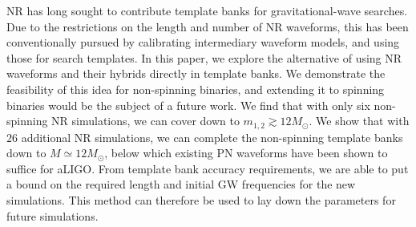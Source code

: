 \documentclass[aps,
prd,
twocolumn,
superscriptaddress,
lengthcheck,showpacs,letterpaper,nofootinbib,
floatfix]{revtex4-1}
\begin{document}
NR has long sought to contribute template banks for gravitational-wave
searches. Due to the restrictions on the length and number of NR waveforms,
this has been conventionally pursued by calibrating intermediary
waveform models, and
using those for search templates. In this paper, we explore the alternative
of using NR waveforms and their hybrids directly in template banks.
We demonstrate the feasibility of this idea for non-spinning binaries,
and extending it to spinning binaries would be the subject of a future
work. We find that with only six non-spinning NR simulations, we can 
cover down to $m_{1,2}\gtrsim 12M_\odot$. We show that with
$26$ additional NR simulations, we can complete the non-spinning template
banks down to $M\simeq 12M_\odot$, below which existing PN waveforms 
have been shown to suffice for aLIGO. From template bank accuracy 
requirements, we are able to put a bound on the required length and 
initial GW frequencies for the new simulations. This method can therefore
be used to lay down the parameters for future simulations. 

\end{document}
